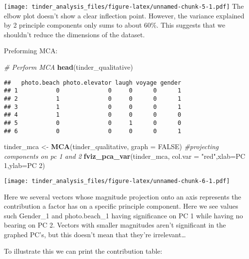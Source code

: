 \documentclass[
]{article}
\newenvironment{Shaded}{\begin{snugshade}}{\end{snugshade}}
\newcommand{\AttributeTok}[1]{\textcolor[rgb]{0.13,0.29,0.53}{#1}}
\newcommand{\CommentTok}[1]{\textcolor[rgb]{0.56,0.35,0.01}{\textit{#1}}}
\newcommand{\ConstantTok}[1]{\textcolor[rgb]{0.56,0.35,0.01}{#1}}
\newcommand{\FunctionTok}[1]{\textcolor[rgb]{0.13,0.29,0.53}{\textbf{#1}}}
\newcommand{\NormalTok}[1]{#1}
\newcommand{\OtherTok}[1]{\textcolor[rgb]{0.56,0.35,0.01}{#1}}
\newcommand{\StringTok}[1]{\textcolor[rgb]{0.31,0.60,0.02}{#1}}
\begin{document}
\texttt{[image: tinder\_analysis\_files/figure-latex/unnamed-chunk-5-1.pdf]}
The elbow plot doesn't show a clear inflection point. However, the
variance explained by 2 principle components only sums to about 60\%.
This suggests that we shouldn't reduce the dimensions of the dataset.

Preforming MCA:

\begin{Shaded}
\begin{Highlighting}[]
\CommentTok{\# Perform MCA}
\FunctionTok{head}\NormalTok{(tinder\_qualitative)}
\end{Highlighting}
\end{Shaded}

\begin{verbatim}
##   photo.beach photo.elevator laugh voyage gender
## 1           0              0     0      0      1
## 2           1              0     0      0      1
## 3           1              0     0      0      1
## 4           1              0     0      0      0
## 5           0              0     1      0      0
## 6           0              0     0      0      1
\end{verbatim}

\begin{Shaded}
\begin{Highlighting}[]
\NormalTok{tinder\_mca }\OtherTok{\textless{}{-}} \FunctionTok{MCA}\NormalTok{(tinder\_qualitative, }\AttributeTok{graph =} \ConstantTok{FALSE}\NormalTok{)}
\CommentTok{\#projecting components on pc 1 and 2}
\FunctionTok{fviz\_pca\_var}\NormalTok{(tinder\_mca, }\AttributeTok{col.var =} \StringTok{"red"}\NormalTok{,}\AttributeTok{xlab=}\StringTok{\textquotesingle{}PC 1\textquotesingle{}}\NormalTok{,}\AttributeTok{ylab=}\StringTok{\textquotesingle{}PC 2\textquotesingle{}}\NormalTok{)}
\end{Highlighting}
\end{Shaded}

\texttt{[image: tinder\_analysis\_files/figure-latex/unnamed-chunk-6-1.pdf]}

Here we several vectors whose magnitude projection onto an axis
represents the contribution a factor has on a specific principle
component. Here we see values such Gender\_1 and photo.beach\_1 having
significance on PC 1 while having no bearing on PC 2. Vectors with
smaller magnitudes aren't significant in the graphed PC's, but this
doesn't mean that they're irrelevant\ldots{}

To illustrate this we can print the contribution table:
\end{document}
